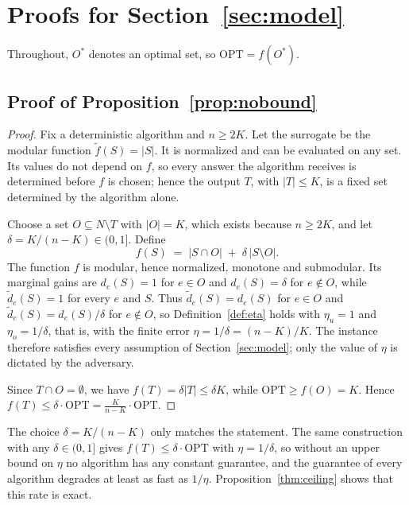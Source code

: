 \section{Proofs for Section~\ref{sec:model}}
\label{app:model}

Throughout, $O^{\ast}$ denotes an optimal set, so $\mathrm{OPT}=f(O^{\ast})$.

\subsection{Proof of Proposition~\ref{prop:nobound}}

\begin{proof}
Fix a deterministic algorithm and $n\ge 2K$. Let the surrogate be the modular function $\tilde f(S)=|S|$. It is normalized and can be evaluated on any set. Its values do not depend on $f$, so every answer the algorithm receives is determined before $f$ is chosen; hence the output $T$, with $|T|\le K$, is a fixed set determined by the algorithm alone.

Choose a set $O\subseteq N\setminus T$ with $|O|=K$, which exists because $n\ge 2K$, and let $\delta=K/(n-K)\in(0,1]$. Define
\[
f(S)\;=\;|S\cap O|\;+\;\delta\,|S\setminus O| .
\]
The function $f$ is modular, hence normalized, monotone and submodular. Its marginal gains are $d_e(S)=1$ for $e\in O$ and $d_e(S)=\delta$ for $e\notin O$, while $\tilde d_e(S)=1$ for every $e$ and $S$. Thus $\tilde d_e(S)=d_e(S)$ for $e\in O$ and $\tilde d_e(S)=d_e(S)/\delta$ for $e\notin O$, so Definition~\ref{def:eta} holds with $\eta_u=1$ and $\eta_o=1/\delta$, that is, with the finite error $\eta=1/\delta=(n-K)/K$. The instance therefore satisfies every assumption of Section~\ref{sec:model}; only the value of $\eta$ is dictated by the adversary.

Since $T\cap O=\emptyset$, we have $f(T)=\delta|T|\le \delta K$, while $\mathrm{OPT}\ge f(O)=K$. Hence $f(T)\le \delta\cdot\mathrm{OPT}=\tfrac{K}{n-K}\cdot\mathrm{OPT}$.
\end{proof}

\begin{remark}
The choice $\delta=K/(n-K)$ only matches the statement. The same construction with any $\delta\in(0,1]$ gives $f(T)\le\delta\cdot\mathrm{OPT}$ with $\eta=1/\delta$, so without an upper bound on $\eta$ no algorithm has any constant guarantee, and the guarantee of every algorithm degrades at least as fast as $1/\eta$. Proposition~\ref{thm:ceiling} shows that this rate is exact.
\end{remark}

